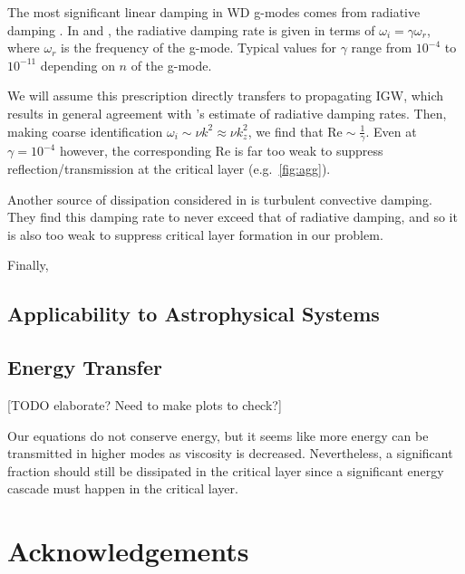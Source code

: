 \documentclass[
        fleqn,
        usenatbib,
    ]{mnras}
\begin{document}
The most significant linear damping in WD g-modes comes from radiative damping
\citep{fullerI}. In \citep{wu} and \citep{fullerI}, the radiative damping rate
is given in terms of $\omega_i = \gamma \omega_r$, where $\omega_r$ is the
frequency of the g-mode. Typical values for $\gamma$ range from $10^{-4}$ to
$10^{-11}$ depending on $n$ of the g-mode.

We will assume this prescription directly transfers to propagating IGW, which
results in general agreement with \citep{bukart}'s estimate of radiative damping
rates. Then, making coarse identification $\omega_i \sim \nu k^2 \approx \nu
k_z^2$, we find that $\mathrm{Re} \sim \frac{1}{\gamma}$. Even at $\gamma =
10^{-4}$ however, the corresponding $\mathrm{Re}$ is far too weak to suppress
reflection/transmission at the critical layer (e.g.\ \autoref{fig:agg}).

Another source of dissipation considered in \citep{bukart} is turbulent
convective damping. They find this damping rate to never exceed that of
radiative damping, and so it is also too weak to suppress critical layer
formation in our problem.

Finally,

\subsection{Applicability to Astrophysical Systems}


\subsection{Energy Transfer}

[TODO elaborate? Need to make plots to check?]

Our equations do not conserve energy, but it seems like more energy can be
transmitted in higher modes as viscosity is decreased. Nevertheless, a
significant fraction should still be dissipated in the critical layer since a
significant energy cascade must happen in the critical layer.

\section{Acknowledgements}\label{s:ack}



\end{document}
